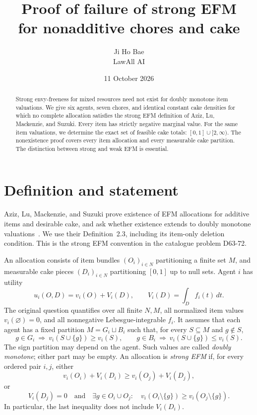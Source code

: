 \documentclass[11pt,a4paper]{article}
\title{Proof of failure of strong EFM\\for nonadditive chores and cake}
\author{Ji Ho Bae\\\small LawAll AI}
\date{11 October 2026}
\begin{document}
\maketitle

\begin{abstract}
Strong envy-freeness for mixed resources need not exist for doubly
monotone item valuations. We give six agents, seven chores, and identical
constant cake densities for which no complete allocation satisfies the
strong EFM definition of Aziz, Lu, Mackenzie, and Suzuki. Every item has
strictly negative marginal value. For the same item valuations, we
determine the exact set of feasible cake totals: $[0,1]\cup[2,\infty)$.
The nonexistence proof covers every item allocation and every measurable
cake partition. The distinction between strong and weak EFM is essential.
\end{abstract}

\section{Definition and statement}

Aziz, Lu, Mackenzie, and Suzuki prove existence of EFM allocations for
additive items and desirable cake, and ask whether existence extends to
doubly monotone valuations~\cite[Section~5]{ALMS}.
We use their Definition~2.3, including its item-only deletion condition.
This is the strong EFM convention in the catalogue problem D63-72.

An allocation consists of item bundles $(O_i)_{i\in N}$ partitioning a
finite set $M$, and measurable cake pieces $(D_i)_{i\in N}$ partitioning
$[0,1]$ up to null sets. Agent $i$ has utility
\[
 u_i(O,D)=v_i(O)+V_i(D),\qquad
 V_i(D)=\int_D f_i(t)\,dt.
\]
The original question quantifies over all finite $N,M$, all normalized
item values $v_i(\varnothing)=0$, and all nonnegative Lebesgue-integrable
$f_i$. It assumes that each agent has a fixed partition $M=G_i\sqcup B_i$
such that, for every $S\subseteq M$ and $g\notin S$,
\[
 g\in G_i\ \Longrightarrow\ v_i(S\cup\{g\})\geq v_i(S),\qquad
 g\in B_i\ \Longrightarrow\ v_i(S\cup\{g\})\leq v_i(S).
\]
The sign partition may depend on the agent. Such values are called
\emph{doubly monotone}; either part may be empty.
An allocation is \emph{strong EFM} if, for every ordered pair $i,j$, either
\begin{equation}\label{eq:EF}
 v_i(O_i)+V_i(D_i)\geq v_i(O_j)+V_i(D_j),
\end{equation}
or
\begin{equation}\label{eq:fallback}
 V_i(D_j)=0
 \quad\text{and}\quad
 \exists g\in O_i\cup O_j:\quad
 v_i(O_i\setminus\{g\})\geq v_i(O_j\setminus\{g\}).
\end{equation}
In particular, the last inequality does not include $V_i(D_i)$.
\end{document}

